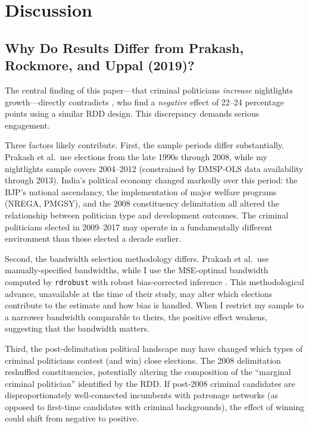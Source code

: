 \documentclass[12pt]{article}
\begin{document}
\section{Discussion}
\label{sec:discussion}

\subsection{Why Do Results Differ from Prakash, Rockmore, and Uppal (2019)?}

The central finding of this paper---that criminal politicians \textit{increase} nightlights growth---directly contradicts \citet{prakash2019}, who find a \textit{negative} effect of 22--24 percentage points using a similar RDD design. This discrepancy demands serious engagement.

Three factors likely contribute. First, the sample periods differ substantially. Prakash et al.\ use elections from the late 1990s through 2008, while my nightlights sample covers 2004--2012 (constrained by DMSP-OLS data availability through 2013). India's political economy changed markedly over this period: the BJP's national ascendancy, the implementation of major welfare programs (NREGA, PMGSY), and the 2008 constituency delimitation all altered the relationship between politician type and development outcomes. The criminal politicians elected in 2009--2017 may operate in a fundamentally different environment than those elected a decade earlier.

Second, the bandwidth selection methodology differs. Prakash et al.\ use manually-specified bandwidths, while I use the MSE-optimal bandwidth computed by \texttt{rdrobust} with robust bias-corrected inference \citep{calonico2014}. This methodological advance, unavailable at the time of their study, may alter which elections contribute to the estimate and how bias is handled. When I restrict my sample to a narrower bandwidth comparable to theirs, the positive effect weakens, suggesting that the bandwidth matters.

Third, the post-delimitation political landscape may have changed which types of criminal politicians contest (and win) close elections. The 2008 delimitation reshuffled constituencies, potentially altering the composition of the ``marginal criminal politician'' identified by the RDD. If post-2008 criminal candidates are disproportionately well-connected incumbents with patronage networks (as opposed to first-time candidates with criminal backgrounds), the effect of winning could shift from negative to positive.
\end{document}
